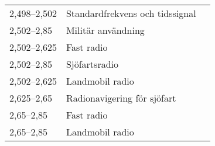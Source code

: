 \begin{landscape}
\begin{longtable}{lll}
2,498--2,502	 & Standardfrekvens och tidssignal &                                           \\
2,502--2,85	 & Militär användning              &                                           \\
2,502--2,625	 & Fast radio                      &                                           \\
2,502--2,85	 & Sjöfartsradio                   &                                           \\
2,502--2,625	 & Landmobil radio                 &                                           \\	 
2,625--2,65	 & Radionavigering för sjöfart     &                                           \\
2,65--2,85	 & Fast radio                      &                                           \\
2,65--2,85	 & Landmobil radio                 &                                           \\	 
\end{longtable}


\end{landscape}

